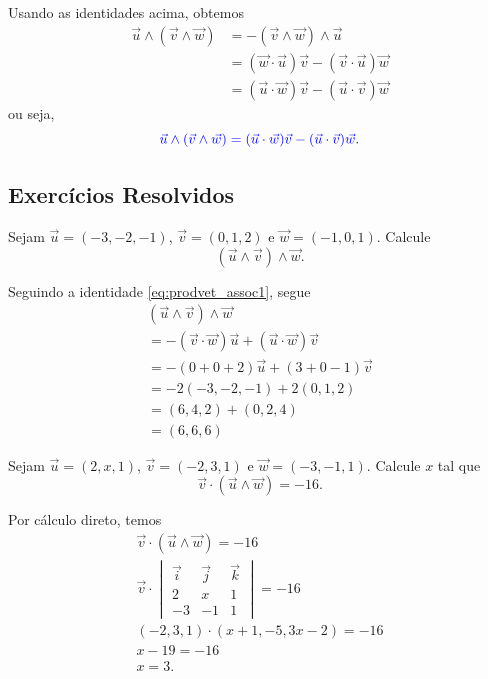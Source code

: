 Usando as identidades acima, obtemos
\begin{align}\label{eq:prodvet_assoc1}
  \vec{u}\land(\vec{v}\land\vec{w}) &= -(\vec{v}\land\vec{w})\land\vec{u}\\
                                    &= (\vec{w}\cdot\vec{u})\vec{v}-(\vec{v}\cdot\vec{u})\vec{w}\\
                                    &= (\vec{u}\cdot\vec{w})\vec{v}-(\vec{u}\cdot\vec{v})\vec{w}
\end{align}
ou seja,
\begin{equation}
  {\color{blue}\vec{u}\land(\vec{v}\land\vec{w}) = (\vec{u}\cdot\vec{w})\vec{v}-(\vec{u}\cdot\vec{v})\vec{w}}.
\end{equation}

\subsection{Exercícios Resolvidos}

\begin{exeresol}
  Sejam $\vec{u}=(-3,-2,-1)$, $\vec{v}=(0,1,2)$ e $\vec{w}=(-1,0,1)$. Calcule
  \begin{equation}
    (\vec{u}\land\vec{v})\land\vec{w}.
  \end{equation}
\end{exeresol}
\begin{resol}
  Seguindo a identidade \eqref{eq:prodvet_assoc1}, segue
  \begin{gather}
    (\vec{u}\land\vec{v})\land\vec{w} \\
    = -(\vec{v}\cdot\vec{w})\vec{u} + (\vec{u}\cdot\vec{w})\vec{v}\\
    = -(0+0+2)\vec{u} + (3+0-1)\vec{v}\\
    = -2(-3,-2,-1)+2(0,1,2)\\
    = (6,4,2)+(0,2,4)\\
    = (6,6,6)
  \end{gather}
\end{resol}


\begin{exeresol}
  Sejam $\vec{u}=(2,x,1)$, $\vec{v}=(-2,3,1)$ e $\vec{w}=(-3,-1,1)$. Calcule $x$ tal que
  \begin{equation}
    \vec{v}\cdot(\vec{u}\land\vec{w})=-16.
  \end{equation}
\end{exeresol}
\begin{resol}
  Por cálculo direto, temos
  \begin{gather}
    \vec{v}\cdot(\vec{u}\land\vec{w})=-16\\
    \vec{v}\cdot
    \begin{vmatrix}
      \vec{i} & \vec{j} & \vec{k}\\
      2 & x & 1 \\
      -3 & -1 & 1
    \end{vmatrix} = -16 \\
    (-2,3,1)\cdot(x+1,-5,3x-2)=-16\\
    x-19 = -16 \\
    x = 3.
  \end{gather}
\end{resol}

